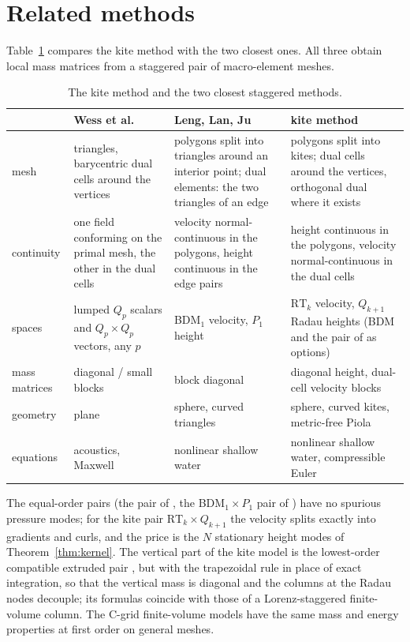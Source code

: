 \documentclass[preprint,12pt]{elsarticle}
\theoremstyle{definition}
\begin{document}
\section{Related methods}\label{sec:related}

Table~\ref{tab:related} compares the kite method with the two closest ones. All three obtain local mass
matrices from a staggered pair of macro-element meshes.

\begin{table}[t]
\centering
\caption{The kite method and the two closest staggered methods.}
\label{tab:related}
\footnotesize
\begin{tabular}{p{1.6cm}p{3.4cm}p{3.4cm}p{3.6cm}}
\toprule
& Wess et al.\ \cite{Wess2024} & Leng, Lan, Ju \cite{LengLanJu2026} & kite method \\
\midrule
mesh & triangles, barycentric dual cells around the vertices &
  polygons split into triangles around an interior point; dual elements: the two triangles of an edge &
  polygons split into kites; dual cells around the vertices, orthogonal dual where it exists \\
continuity & one field conforming on the primal mesh, the other in the dual cells &
  velocity normal-continuous in the polygons, height continuous in the edge pairs &
  height continuous in the polygons, velocity normal-continuous in the dual cells \\
spaces & lumped $Q_p$ scalars and $Q_p\times Q_p$ vectors, any $p$ &
  BDM$_1$ velocity, $P_1$ height & $\mathrm{RT}_k$ velocity, $Q_{k+1}$ Radau heights (BDM and the pair of
  \cite{Wess2024} as options) \\
mass matrices & diagonal / small blocks & block diagonal & diagonal height, dual-cell velocity blocks \\
geometry & plane & sphere, curved triangles & sphere, curved kites, metric-free Piola \\
equations & acoustics, Maxwell & nonlinear shallow water & nonlinear shallow water, compressible Euler \\
\bottomrule
\end{tabular}
\end{table}

The equal-order pairs (the pair of \cite{Wess2024}, the BDM$_1\times P_1$ pair of \cite{LengLanJu2026})
have no spurious pressure modes; for the kite pair $\mathrm{RT}_k\times Q_{k+1}$ the velocity splits exactly
into gradients and curls, and the price is the $N$ stationary height modes of Theorem~\ref{thm:kernel}.
The vertical part of the kite model is the lowest-order compatible extruded pair
\cite{NataleShiptonCotter2016,Melvin2019}, but with the trapezoidal rule in place of exact integration, so that
the vertical mass is diagonal and the columns at the Radau nodes decouple; its formulas coincide with those of
a Lorenz-staggered finite-volume column. The C-grid finite-volume models \cite{Thuburn2009,Ringler2010,Zaengl2015}
have the same mass and energy properties at first order on general meshes.
\end{document}
